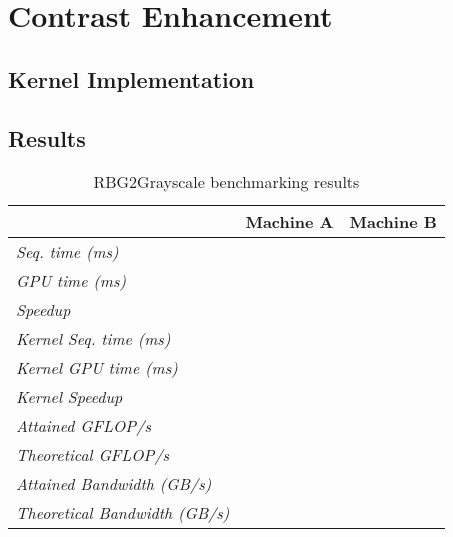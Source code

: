 \documentclass[final]{report}
\begin{document}
\chapter{Contrast Enhancement}

\section{Kernel Implementation}



\section{Results}
\begin{table}[H]
	\centering
	\caption{RBG2Grayscale benchmarking results}
	\label{tab:rgb2grayscale-results}
	\begin{tabular}{lll}
	\toprule
											& \textbf{Machine A} 	& \textbf{Machine B} \\
	\midrule
	\textit{Seq. time (ms)} 				& ~ 					& ~ \\
	\textit{GPU time (ms)} 					& ~ 					& ~ \\
	\textit{Speedup} 						& ~ 					& ~ \\
	\midrule
	\textit{Kernel Seq. time (ms)} 			& ~ 					& ~ \\
	\textit{Kernel GPU time (ms)} 			& ~ 					& ~ \\
	\textit{Kernel Speedup} 				& ~ 					& ~ \\
	\midrule
	\textit{Attained GFLOP/s} 				& ~ 					& ~ \\
	\textit{Theoretical GFLOP/s} 			& ~ 					& ~ \\
	\textit{Attained Bandwidth (GB/s)}		& ~ 					& ~ \\
	\textit{Theoretical Bandwidth (GB/s)}	& ~ 					& ~ \\
	\bottomrule
	\end{tabular}
\end{table}

\end{document}

